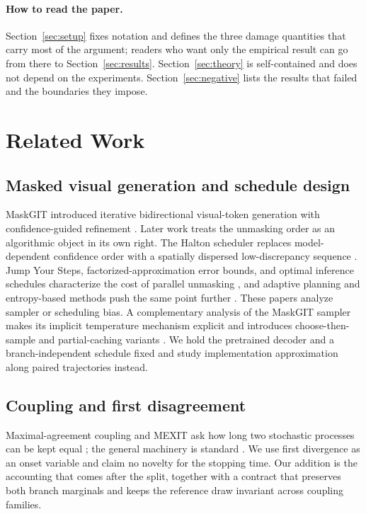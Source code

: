 \documentclass[11pt,a4paper]{article}
\theoremstyle{plain}
\theoremstyle{definition}
\theoremstyle{remark}
\begin{document}
\paragraph{How to read the paper.}
Section~\ref{sec:setup} fixes notation and defines the three damage quantities
that carry most of the argument; readers who want only the empirical result can
go from there to Section~\ref{sec:results}. Section~\ref{sec:theory} is
self-contained and does not depend on the experiments.
Section~\ref{sec:negative} lists the results that failed and the boundaries they
impose.

\section{Related Work}

\subsection{Masked visual generation and schedule design}
MaskGIT introduced iterative bidirectional visual-token generation with
confidence-guided refinement \citep{chang2022maskgit}. Later work treats the
unmasking order as an algorithmic object in its own right. The Halton scheduler
replaces model-dependent confidence order with a spatially dispersed
low-discrepancy sequence \citep{halton1960efficiency,besnier2025halton}. Jump
Your Steps, factorized-approximation error bounds, and optimal inference
schedules characterize the cost of parallel unmasking
\citep{park2025jump,lavenant2025error,chen2026optimal}, and adaptive planning and
entropy-based methods push the same point further
\citep{kim2025train,peng2025path,benhamu2025accelerated,cai2026confidence}. These papers analyze sampler or scheduling bias. A complementary analysis of
the MaskGIT sampler makes its implicit temperature mechanism explicit and
introduces choose-then-sample and partial-caching variants
\citep{hayakawa2025demystifying}. We hold the pretrained decoder and a
branch-independent schedule fixed and study implementation approximation along
paired trajectories instead.

\subsection{Coupling and first disagreement}
Maximal-agreement coupling and MEXIT ask how long two stochastic processes can be
kept equal \citep{vollering2016maximal,ernst2019mexit}; the general machinery is
standard \citep{lindvall2002coupling,levin2017markov}. We use first divergence as
an onset variable and claim no novelty for the stopping time. Our addition is the
accounting that comes after the split, together with a contract that preserves
both branch marginals and keeps the reference draw invariant across coupling
families.
\end{document}

